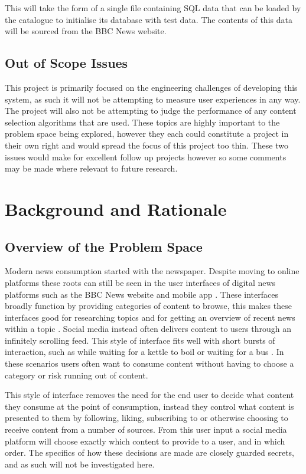 \documentclass[12pt,titlepage]{article}
\begin{document}
    This will take the form of a single file containing SQL data that can be
    loaded by the catalogue to initialise its database with test data. The
    contents of this data will be sourced from the BBC News website.

  \subsection{Out of Scope Issues}

  This project is primarily focused on the engineering challenges of developing
  this system, as such it will not be attempting to measure user experiences in
  any way. The project will also not be attempting to judge the performance of
  any content selection algorithms that are used. These topics are highly
  important to the problem space being explored, however they each could
  constitute a project in their own right and would spread the focus of this
  project too thin. These two issues would make for excellent follow up projects
  however so some comments may be made where relevant to future research.

\section{Background and Rationale}

  \subsection{Overview of the Problem Space}

  Modern news consumption started with the newspaper. Despite moving to online
  platforms these roots can still be seen in the user interfaces of digital news
  platforms such as the BBC News website and mobile app \citep{ofcom}. These
  interfaces broadly function by providing categories of content to browse, this
  makes these interfaces good for researching topics and for getting an overview
  of recent news within a topic \citep{yalanska_2021}. Social media instead often
  delivers content to users through an infinitely scrolling feed. This style of
  interface fits well with short bursts of interaction, such as while waiting
  for a kettle to boil or waiting for a bus \citep{yalanska_2020}. In these
  scenarios users often want to consume content without having to choose a
  category or risk running out of content.

  This style of interface removes the need for the end user to decide what
  content they consume at the point of consumption, instead they control what
  content is presented to them by following, liking, subscribing to or otherwise
  choosing to receive content from a number of sources. From this user input a
  social media platform will choose exactly which content to provide to a user,
  and in which order. The specifics of how these decisions are made are closely
  guarded secrets, and as such will not be investigated here.
\end{document}
